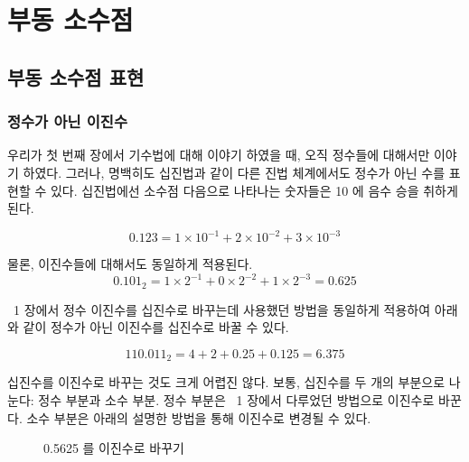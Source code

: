 ﻿%
\chapter{부동 소수점}

\section{부동 소수점 표현}

\subsection{정수가 아닌 이진수}

우리가 첫 번째 장에서 기수법에 대해 이야기 하였을 때, 오직 정수들에 대해서만 이야기 하였다.
그러나, 명백히도 십진법과 같이 다른 진법 체계에서도 정수가 아닌 수를 표현할 수 있다. 십진법에선
소수점 다음으로 나타나는 숫자들은 10 에 음수 승을 취하게 된다. 

\[ 0.123 = 1 \times 10^{-1} + 2 \times 10^{-2} + 3 \times 10^{-3} \]

물론, 이진수들에 대해서도 동일하게 적용된다. 
\[ 0.101_2 = 1 \times 2^{-1} + 0 \times 2^{-2} + 1 \times 2^{-3} = 0.625 \]

~1 장에서 정수 이진수를 십진수로 바꾸는데 사용했던 방법을 동일하게 적용하여 아래와 같이
정수가 아닌 이진수를 십진수로 바꿀 수 있다. 

\[ 110.011_2 = 4 + 2 + 0.25 + 0.125 = 6.375 \]

십진수를 이진수로 바꾸는 것도 크게 어렵진 않다. 보통, 십진수를 두 개의 부분으로 나눈다:
정수 부분과 소수 부분. 정수 부분은 ~1 장에서 다루었던 방법으로 이진수로 바꾼다. 소수 부분은
아래의 설명한 방법을 통해 이진수로 변경될 수 있다. 

\begin{figure}[t]
\centering
{}
\caption{0.5625 를 이진수로 바꾸기\label{fig:binConvert1}}
\end{figure}

